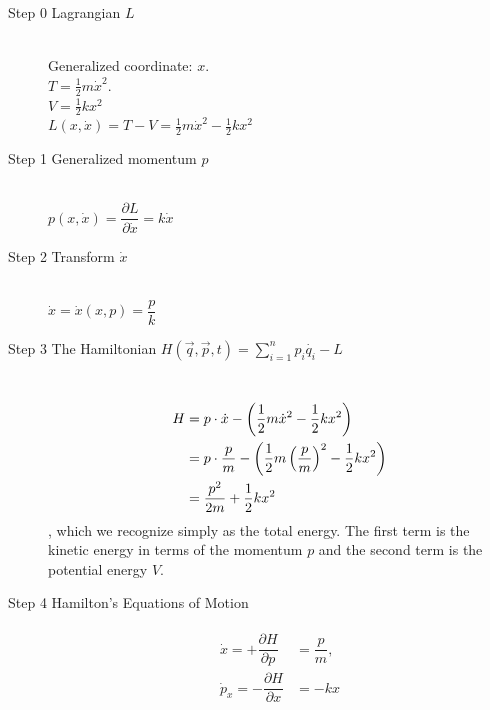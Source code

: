 \begin{description}
\item[Step 0 \quad Lagrangian $L$] \ \\[0.5cm]
Generalized coordinate: $x$. \\[0.2cm]
$T = \frac{1}{2} m \dot{x}^2.$ \\[0.2cm]
$V = \frac{1}{2} k x^2$ \\[0.2cm]
$L(x, \dot{x}) = T - V = \frac{1}{2} m \dot{x}^2 - \frac{1}{2} k x^2$

\item[Step 1 \quad Generalized momentum $p$] \ \\[0.2cm]
$p(x,\dot{x}) = \dfrac{\partial L}{\partial \dot{x}} = k \dot{x}$

\item[Step 2 \quad Transform $\dot{x}$] \ \\[0.5cm]
$\dot{x} = \dot{x}(x, p) = \dfrac{p}{k}$

\item[Step 3 \quad The Hamiltonian $H(\vec{q}, \vec{p}, t) = \sum\limits_{i=1}^n p_i \dot{q_i} - L$] \ \\
\begin{align}
\notag H &= p \cdot \dot{x} - \left(\frac{1}{2} m \dot{x}^2 - \frac{1}{2} k x^2\right) \\
\notag  &= p \cdot \dfrac{p}{m} - \left(\frac{1}{2} m \left(\frac{p}{m}\right)^2 - \frac{1}{2} k x^2\right) \\
&= \dfrac{p^2}{2m} + \dfrac{1}{2}k x^2
\end{align}
, which we recognize simply as the total energy. The first term is the kinetic energy in terms of the momentum $p$ and the second term is the potential energy $V$.

\item[Step 4 \quad Hamilton's Equations of Motion]
\begin{align}
\begin{split}
\label{eq:ho-eom}
\dot{x} = +\dfrac{\partial H}{\partial p} &= \dfrac{p}{m} ,
\\[0.2cm]
\dot{p}_x = -\dfrac{\partial H}{\partial x} &= - k x
\end{split}
\end{align}
\end{description}

